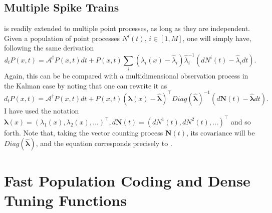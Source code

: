 {\subsection{Multiple Spike Trains}

 is readily extended to multiple point processes, as long as they are independent. Given a population of point processes $N^i(t)$, $i\in [1,M]$, one will simply have, following the same derivation
\begin{equation}
\label{eq:snyder_multi}
d_t P(x,t) = \mathcal{A}^\dagger P(x,t) dt + P(x,t)\sum_i\left(\lambda_i(x)-\hat{\lambda}_i\right)\hat{\lambda}_i^{-1}\left(dN^i(t)-\hat{\lambda}_i dt\right).
\end{equation}
Again, this can be be compared with a multidimensional observation process in the Kalman case by noting that one can rewrite it as
\begin{equation}
\nonumber
d_t P(x,t) = \mathcal{A}^\dagger P(x,t) dt + P(x,t)\left(\boldsymbol{\lambda}(x)-\hat{\boldsymbol{\lambda}}\right)^\top Diag(\hat{\boldsymbol{\lambda}})^{-1}\left(d\boldsymbol{N}(t)-\hat{\boldsymbol{\lambda}} dt\right).
\end{equation}
I have used the notation $\boldsymbol{\lambda}(x) = (\lambda_1(x),\lambda_2(x),\ldots)^\top, d\boldsymbol{N}(t) = (dN^1(t), dN^2(t),\ldots)^\top$ and so forth. Note that, taking the
vector counting process $\boldsymbol{N}(t)$, its covariance will be $Diag(\hat{\boldsymbol{\lambda}})$, and the equation corresponds precisely to .

\section{Fast Population Coding and Dense Tuning Functions}

\label{sec:fast_coding}

}
